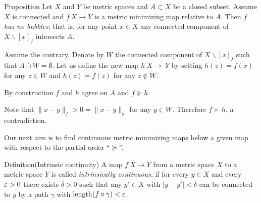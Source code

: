 \documentclass{article}
\begin{document}



\begin{thm}{Proposition}\label{prop:point-complement}
Let $X$ and $Y$ be metric spaces and $A\subset X$ be a closed subset.
Assume $X$ is connected and $f\:X\to Y$ is a metric minimizing map relative to $A$.
Then $f$ \label{page:no-bubble}\emph{has no bubbles}; that is, for any point $x\in X$ any connected component of $X\backslash [x]_f$ intersects $A$.

\end{thm}

Assume the contrary.
Denote by $W$ the connected component of $X\backslash [x]_f$ such that $A\cap W=\emptyset$.
Let us define the new map $h\:X\to\ Y$ by setting $h(z)=f(x)$ for any $z\in W$ and $h(z)=f(z)$ for any $z\notin W$.

By construction $f$ and $h$ agree on $A$ and $f\succcurlyeq h$.

Note that $\|x-y\|_f>0=\|x-y\|_h$ for any $y\in W$.
Therefore $f\succ h$, a contradiction.
\qeds

Our next aim is to 
find continuous metric minimizing maps below a given map with respect to the partial order ``$\succcurlyeq$''.

\begin{thm}{Definition}(Intrinsic continuity)
A map $f\:X\to Y$ from a metric space $X$ to a metric space
 $Y$ is called
{\em intrinsically continuous}, if for every $y\in X$ 
and every $\varepsilon>0$ there
exists $\delta>0$ such that any  $y'\in X$
with $|y-y'|<\delta$ can be connected to $y$ by a path $\gamma$ 
with $\mathop{\rm length}\nolimits(f\circ\gamma)<\varepsilon$.
\end{thm}
\end{document}
